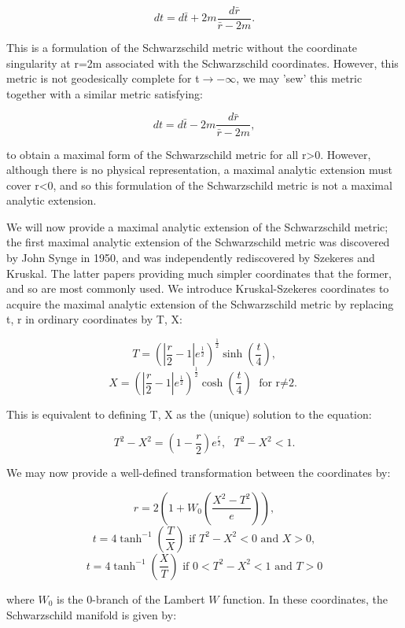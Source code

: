 \documentclass[oneside,openright,frontopenright, singlespacing]{dmathesis}
\begin{document}
	\[dt = d\bar{t}+2m\frac{d\bar{r}}{\bar{r}-2m}.\]

\vspace{1em}
	This is a formulation of the Schwarzschild metric without the coordinate singularity at r=2m associated with the Schwarzschild coordinates. However, this metric is not geodesically complete for t$\rightarrow-\infty$, we may 'sew' this metric together with a similar metric satisfying:

	\[dt = d\bar{t}-2m\frac{d\bar{r}}{\bar{r}-2m},\]

	to obtain a maximal form of the Schwarzschild metric for all r>0. However, although there is no physical representation, a maximal analytic extension must cover r<0, and so this formulation of the Schwarzschild metric is not a maximal analytic extension.

\vspace{1em}
	We will now provide a maximal analytic extension of the Schwarzschild metric; the first maximal analytic extension of the Schwarzschild metric was discovered by John Synge in 1950\cite{synge1950gravitational}, and was independently rediscovered by Szekeres\cite{szekeres1960singularities} and Kruskal\cite{kruskal1960maximal}. The latter papers providing much simpler coordinates that the former, and so are most commonly used. We introduce Kruskal-Szekeres coordinates to acquire the maximal analytic extension of the Schwarzschild metric by replacing t, r in ordinary coordinates by T, X:

	\[T=(|\frac{r}{2}-1|e^{\frac{1}{2}})^{\frac{1}{2}}\sinh\left(\frac{t}{4}\right),\]
	\[X=(|\frac{r}{2}-1|e^{\frac{1}{2}})^{\frac{1}{2}}\cosh\left(\frac{t}{4}\right) \mbox{ for r$\neq$2.}\]

\vspace{1em}
	This is equivalent to defining T, X as the (unique) solution to the equation:

	\[T^2-X^2 = \left(1-\frac{r}{2}\right)e^{\frac{r}{2}},\mbox{ } T^2-X^2<1.\]

\vspace{1em}
	We may now provide a well-defined transformation between the coordinates by:

	\[r = 2\left(1+W_0\left(\frac{X^2-T^2}{e}\right)\right),\]
	\[t = 4\tanh^{-1}\left(\frac{T}{X}\right) \mbox{ if }T^2-X^2<0 \mbox{ and } X>0,\]
	\[t = 4\tanh^{-1}\left(\frac{X}{T}\right) \mbox{ if }0<T^2-X^2<1 \mbox{ and } T>0\]

	where $W_0$ is the 0-branch of the Lambert $W$ function. In these coordinates, the Schwarzschild manifold is given by:
\end{document}
